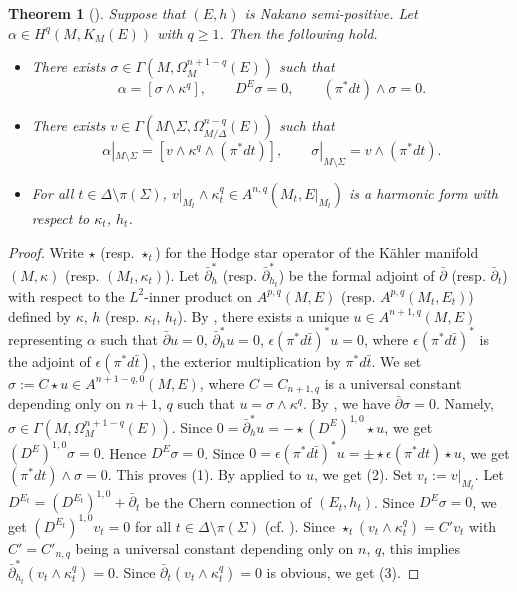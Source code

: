 \documentclass[amscd, leqno]{amsart}
\theoremstyle{plain}
\newtheorem{theorem}{Theorem}[section]
\theoremstyle{definition}
\theoremstyle{remark}
\newenvironment{pf}{\begin{proof}}{\end{proof}}
\begin{document}
\begin{theorem}[\cite{Takegoshi95, MourouganeTakayama08}]
\label{Thm:Takegoshi}
Suppose that $(E,h)$ is Nakano semi-positive. Let $\alpha \in H^{q}(M, K_{M}(E))$ with $q\geq 1$. Then the following hold.
\begin{itemize}
\item[(1)]
There exists $\sigma\in \Gamma(M,\Omega^{n+1-q}_{M}(E))$ such that
$$
\alpha = [ \sigma\wedge\kappa^{q} ],
\qquad
D^{E}\sigma = 0,
\qquad
(\pi^{*}dt)\wedge\sigma=0.
$$
\item[(2)]
There exists $v\in \Gamma(M\setminus\varSigma,\Omega^{n-q}_{M/\varDelta}(E))$ such that
$$
\alpha|_{M\setminus\varSigma} = [ v\wedge\kappa^{q}\wedge(\pi^{*}dt) ],
\qquad
\sigma|_{M\setminus\varSigma} = v \wedge (\pi^{*}dt).
$$
\item[(3)]
For all $t\in\varDelta\setminus\pi(\varSigma)$, $v|_{M_{t}}\wedge\kappa_{t}^{q}\in A^{n,q}(M_{t},E|_{M_{t}})$ is a harmonic form 
with respect to $\kappa_{t}$, $h_{t}$.
\end{itemize}
\end{theorem}

\begin{pf}
Write $\star$ (resp. $\star_{t}$) for the Hodge star operator of the K\"ahler manifold $(M, \kappa)$ (resp. $(M_{t}, \kappa_{t})$). 
Let $\bar{\partial}^{*}_{h}$ (resp. $\bar{\partial}^{*}_{h_{t}}$) be the formal adjoint of $\bar{\partial}$ (resp. $\bar{\partial}_{t}$) with respect to 
the $L^{2}$-inner product on $A^{p,q}(M,E)$ (resp. $A^{p,q}(M_{t},E_{t})$) defined by $\kappa$, $h$ (resp. $\kappa_{t}$, $h_{t}$).
By \cite[Th.\,5.2 (i) and p.405 l.8]{Takegoshi95}, there exists a unique $u \in A^{n+1,q}(M,E)$ representing $\alpha$ such that 
$\bar{\partial}u=0$, 
$\bar{\partial}^{*}_{h} u =0$, $\epsilon(\pi^{*}d\bar{t})^{*}u=0$, where $\epsilon(\pi^{*}d\bar{t})^{*}$ is the adjoint of $\epsilon(\pi^{*}d\bar{t})$, 
the exterior multiplication by $\pi^{*}d\bar{t}$. We set $\sigma := C\star u \in A^{n+1-q, 0}(M,E)$, 
where $C=C_{n+1,q}$ is a universal constant depending only on $n+1$, $q$ such that $u = \sigma \wedge \kappa^{q}$.
By \cite[Th.\,4.3 (i)]{Takegoshi95}, we have $\bar{\partial} \sigma =0$. Namely, $\sigma \in \Gamma(M,\Omega^{n+1-q}_{M}(E))$.
Since $0= \bar{\partial}^{*}_{h} u = -\star (D^{E})^{1,0} \star u$, we get $(D^{E})^{1,0}\sigma=0$. Hence $D^{E}\sigma = 0$.
Since $0 = \epsilon(\pi^{*}d\bar{t})^{*}u = \pm \star \epsilon(\pi^{*}dt) \star u$, we get $(\pi^{*}dt)\wedge\sigma=0$. 
This proves (1).  
By \cite[Th.\,5.2 (ii)]{Takegoshi95} applied to $u$, we get (2). 
Set $v_{t} := v|_{M_{t}}$. Let $D^{E_{t}} = (D^{E_{t}})^{1,0} + \bar{\partial}_{t}$ be the Chern connection of $(E_{t}, h_{t})$.
Since $D^{E}\sigma=0$, we get $(D^{E_{t}})^{1,0}v_{t} =0$ for all $t\in\varDelta\setminus\pi(\varSigma)$
(cf. \cite[Lemmas~4.5 and 4.7 (1)]{MourouganeTakayama08}).
Since $\star_{t}(v_{t} \wedge \kappa_{t}^{q}) = C' v_{t}$ with $C'=C'_{n,q}$ being a universal constant depending only on $n$, $q$, 
this implies $\bar{\partial}_{h_{t}}^{*} (v_{t} \wedge \kappa_{t}^{q}) =0$.
Since $\bar{\partial}_{t} (v_{t} \wedge \kappa_{t}^{q}) =0$ is obvious, we get (3). 
\end{pf}
\end{document}
